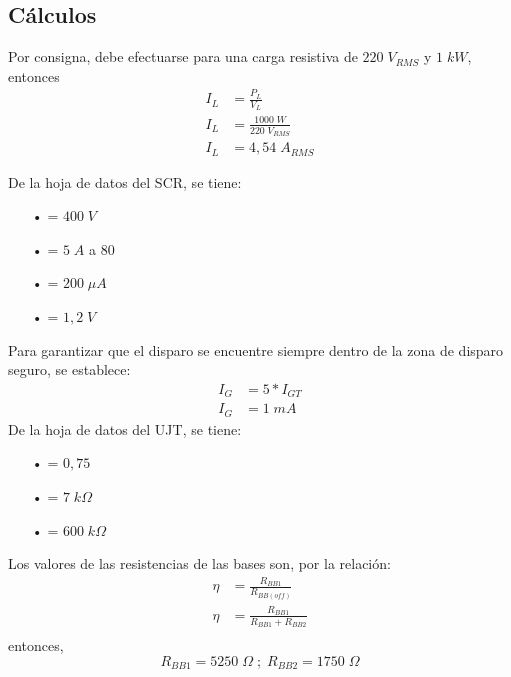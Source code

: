 \documentclass{article}
\begin{document}
\subsection{Cálculos}
Por consigna, debe efectuarse para una carga resistiva de $220\;V_{RMS}$ y $1\;kW$, entonces
\begin{align*}
	I_L &= \frac{P_L}{V_L} \\
	I_L	&= \frac{1000\;W}{220\;V_{RMS}} \\
	I_L	&= 4,54 \; A_{RMS}
\end{align*}

De la hoja de datos del SCR, se tiene:
%
\begin{itemize}\itemsep0em \itemindent=2em
	\item[•]{= $400 \; V$}
	\item[•]{= $5 \; A$ a 80}
	\item[•]{= $200 \; \mu A$}
	\item[•]{= $1,2 \; V$}
\end{itemize}
Para garantizar que el disparo se encuentre siempre dentro de la zona de disparo seguro, se establece:
\begin{align*}
	I_G &= 5 * I_{GT} \\
	I_G	&= 1 \; mA
\end{align*}
%
De la hoja de datos del UJT, se tiene:
\begin{itemize}\itemsep0em \itemindent=2em
	\item[•]{\makebox[1.8cm]{$\eta$\hfill}= $0,75$}
	\item[•]{= $7 \; k\Omega$}
	\item[•]{= $600 \; k\Omega$}
\end{itemize}
%
Los valores de las resistencias de las bases son, por la relación:
\begin{align*}
	\eta &= \frac{R_{BB1}}{R_{BB(off)}} \\
	\eta &= \frac{R_{BB1}}{R_{BB1} + R_{BB2}}\\
\end{align*}
entonces, 
\[R_{BB1} = 5250 \; \Omega \; ; \; R_{BB2} = 1750 \; \Omega \]
\clearpage
%
\end{document}
